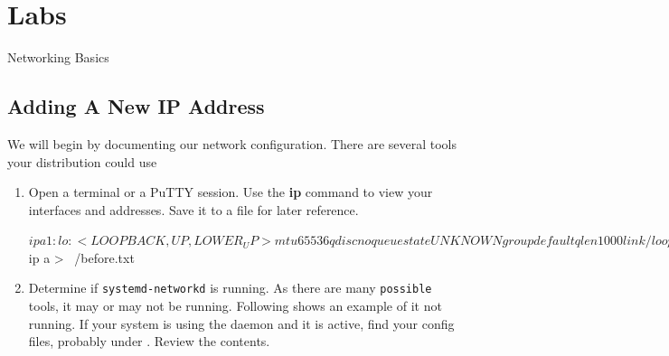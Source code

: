 \clearpage\section{Labs}\begin{Lab}

\begin{exe} {Networking Basics}

	\subsection*{Adding A New IP Address}
   We will begin by documenting our network configuration. 
	There are several tools your distribution could use

      \begin{enumerate}
         \item
		 Open a terminal or a PuTTY session. Use the 
		      \textbf{ip} command
		      to view your interfaces and addresses.
		      Save it to a file for later reference.
		      \begin{raw}
$ ip a
1: lo: <LOOPBACK,UP,LOWER_UP> mtu 65536 qdisc noqueue state UNKNOWN group default qlen 1000
    link/loopback 00:00:00:00:00:00 brd 00:00:00:00:00:00
    inet 127.0.0.1/8 scope host lo
       valid_lft forever preferred_lft forever
    inet6 ::1/128 scope host
       valid_lft forever preferred_lft forever
2: eth0: <BROADCAST,MULTICAST,UP,LOWER_UP> mtu 9001 qdisc mq state UP group default qlen 1000
    link/ether 06:04:be:c0:bf:7c brd ff:ff:ff:ff:ff:ff
    inet 172.31.21.106/20 brd 172.31.31.255 scope global dynamic eth0
       valid_lft 2225sec preferred_lft 2225sec
    inet6 fe80::404:beff:fec0:bf7c/64 scope link
       valid_lft forever preferred_lft forever

$ ip a > ~/before.txt
		      \end{raw}

         \item
		 Determine if \verb:systemd-networkd: is running. As
		      there are many \texttt{possible} tools, it may
		      or may not be running. Following shows an 
		      example of it not running. If your system is using
		      the daemon and it is active, find your config files, 
		      probably under . Review
		      the contents.


\end{enumerate}
\end{exe}
\end{Lab}
